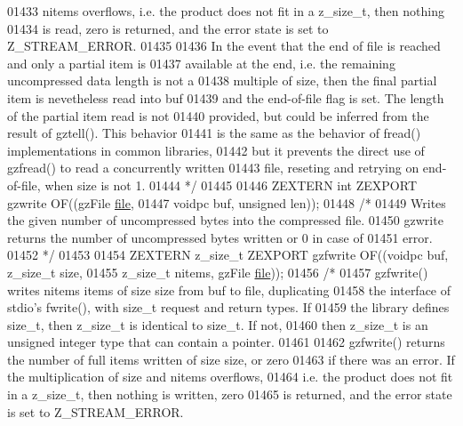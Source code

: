 \begin{DoxyCode}
01433 \textcolor{comment}{   nitems overflows, i.e. the product does not fit in a z\_size\_t, then nothing}
01434 \textcolor{comment}{   is read, zero is returned, and the error state is set to Z\_STREAM\_ERROR.}
01435 \textcolor{comment}{}
01436 \textcolor{comment}{     In the event that the end of file is reached and only a partial item is}
01437 \textcolor{comment}{   available at the end, i.e. the remaining uncompressed data length is not a}
01438 \textcolor{comment}{   multiple of size, then the final partial item is nevetheless read into buf}
01439 \textcolor{comment}{   and the end-of-file flag is set.  The length of the partial item read is not}
01440 \textcolor{comment}{   provided, but could be inferred from the result of gztell().  This behavior}
01441 \textcolor{comment}{   is the same as the behavior of fread() implementations in common libraries,}
01442 \textcolor{comment}{   but it prevents the direct use of gzfread() to read a concurrently written}
01443 \textcolor{comment}{   file, reseting and retrying on end-of-file, when size is not 1.}
01444 \textcolor{comment}{*/}
01445 
01446 ZEXTERN \textcolor{keywordtype}{int} ZEXPORT gzwrite OF((gzFile \hyperlink{structfile}{file},
01447                                 voidpc buf, \textcolor{keywordtype}{unsigned} len));
01448 \textcolor{comment}{/*}
01449 \textcolor{comment}{     Writes the given number of uncompressed bytes into the compressed file.}
01450 \textcolor{comment}{   gzwrite returns the number of uncompressed bytes written or 0 in case of}
01451 \textcolor{comment}{   error.}
01452 \textcolor{comment}{*/}
01453 
01454 ZEXTERN z\_size\_t ZEXPORT gzfwrite OF((voidpc buf, z\_size\_t size,
01455                                       z\_size\_t nitems, gzFile \hyperlink{structfile}{file}));
01456 \textcolor{comment}{/*}
01457 \textcolor{comment}{     gzfwrite() writes nitems items of size size from buf to file, duplicating}
01458 \textcolor{comment}{   the interface of stdio's fwrite(), with size\_t request and return types.  If}
01459 \textcolor{comment}{   the library defines size\_t, then z\_size\_t is identical to size\_t.  If not,}
01460 \textcolor{comment}{   then z\_size\_t is an unsigned integer type that can contain a pointer.}
01461 \textcolor{comment}{}
01462 \textcolor{comment}{     gzfwrite() returns the number of full items written of size size, or zero}
01463 \textcolor{comment}{   if there was an error.  If the multiplication of size and nitems overflows,}
01464 \textcolor{comment}{   i.e. the product does not fit in a z\_size\_t, then nothing is written, zero}
01465 \textcolor{comment}{   is returned, and the error state is set to Z\_STREAM\_ERROR.}

\end{DoxyCode}
